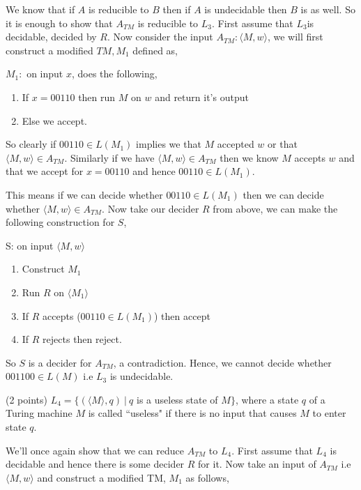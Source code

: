 \documentclass[11pt]{article}
\begin{document}
\begin{enumerate}
\begin{answer}
    We know that if $A$ is reducible to $B$ then if $A$ is undecidable then $B$ is as well. So it is enough to show that $A_{TM}$ is reducible to $L_3$. First assume that $L_{3}$is decidable, decided by $R$. Now consider the input $A_{TM}: \langle M, w \rangle$, we will first construct a modified $TM, M_{1}$ defined as, 
    
        $M_{1}: $ on input $x$, does the following,

    \begin{enumerate}
        \item If $x = 00110$ then run $M$ on $w$ and return it's output
        \item Else we accept.
    \end{enumerate}

    So clearly if $00110 \in L(M_{1})$ implies we that $M$ accepted $w$ or that $\langle M, w \rangle \in A_{TM}$. Similarly if we have $\langle M, w \rangle \in A_{TM}$ then we know  $M$ accepts $w$ and that we accept for $x = 00110 $ and hence $00110 \in L(M_{1})$.
    \vspace{1em}
    
    This means if we can decide whether $00110 \in L(M_{1})$ then we can decide whether $\langle M, w \rangle \in A_{TM}$. Now take our decider $R$ from above, we can make the following construction for $S$,

    S: on input $\langle M, w \rangle$
    \begin{enumerate}
        \item Construct $M_{1}$
        \item Run $R$ on $\langle M_{1} \rangle$
        \item If $R$ accepts ($00110 \in L(M_{1})$) then accept
        \item If $R$ rejects then reject.
    \end{enumerate}

So $S$ is a decider for $A_{TM}$, a contradiction. Hence, we cannot decide whether $001100 \in L(M)$ i.e $L_{3}$ is undecidable.
\end{answer}

 (2 points) $L_4 = \{ (\langle M \rangle, q)\ |\ q$ is a useless state of $M\}$, where a state $q$ of a Turing machine $M$ is called ``useless" if there is no input that causes $M$ to enter state $q$.

 \begin{answer}
     We'll once again show that we can reduce $A_{TM}$ to $L_{4}$. First assume that $L_{4}$ is decidable and hence there is some decider $R$ for it. Now take an input of $A_{TM}$ i.e $\langle M, w \rangle$ and construct a modified TM, $M_{1}$ as follows, 


\end{answer}
\end{enumerate}
\end{document}
